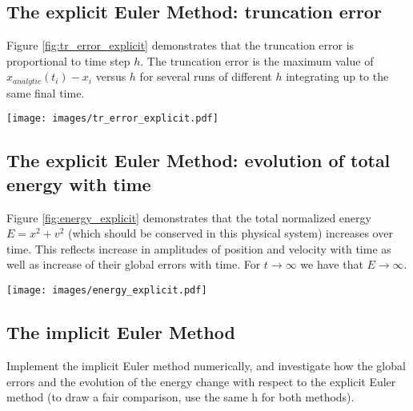 \documentclass{article}
\newenvironment{Figure}
  {\par\medskip\noindent\minipage{\linewidth}}
  {\endminipage\par\medskip}
\begin{document}
\newpage

\subsection{The explicit Euler Method: truncation error}

Figure \ref{fig:tr_error_explicit} demonstrates that the truncation error is proportional to time step $h$. The truncation error is the maximum value of $ x_{analytic}(t_{i}) − x_{i} $ versus $h$ for several runs of different $h$ integrating up to the same final time.

\begin{Figure}
\centering
\texttt{[image: images/tr\_error\_explicit.pdf]}
\label{fig:tr_error_explicit}
\end{Figure}

\newpage
\subsection{The explicit Euler Method: evolution of total energy with time}

Figure \ref{fig:energy_explicit} demonstrates that the total normalized energy $E = x^2 + v^2$
(which should be conserved in this physical system) increases over time. This reflects increase in amplitudes of position and velocity with time as well as increase of their global errors with time. For $t \to \infty $ we have that $E \to \infty $.

\begin{Figure}
\centering
\texttt{[image: images/energy\_explicit.pdf]}
\label{fig:energy_explicit}
\end{Figure}

\newpage
\subsection{The implicit Euler Method}

Implement the implicit Euler
method numerically, and investigate how the global errors and the evolution of the energy
change with respect to the explicit Euler method (to draw a fair comparison, use the same
h for both methods).
\end{document}
